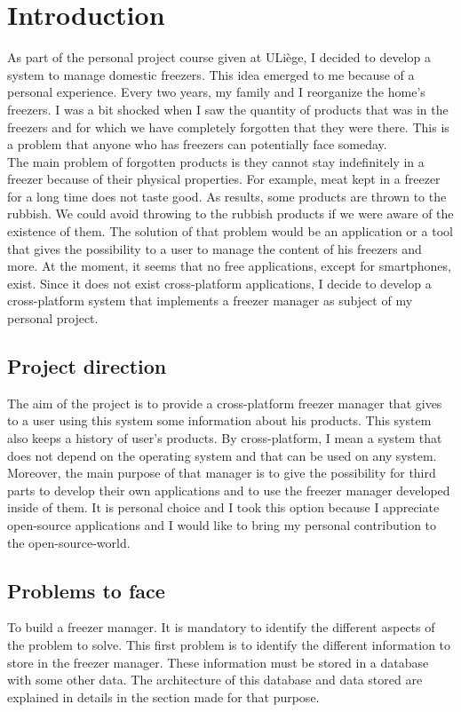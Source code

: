 \section{Introduction}
As part of the personal project course given at ULiège, I decided to develop a system to manage domestic freezers. This idea emerged to me because of a personal experience. Every two years, my family and I reorganize the home's freezers. I was a bit shocked when I saw the quantity of products that was in the freezers and for which we have completely forgotten that they were there. This is a problem that anyone who has freezers can potentially face someday. \\

The main problem of forgotten products is they cannot stay indefinitely in a freezer because of their physical properties. For example, meat kept in a freezer for a long time does not taste good. As results, some products are thrown to the rubbish. We could avoid throwing to the rubbish products if we were aware of the existence of them. The solution of that problem would be an application or a tool that gives the possibility to a user to manage the content of his freezers and more. At the moment, it seems that no free applications, except for smartphones, exist. Since it does not exist cross-platform applications, I decide to develop a cross-platform system that implements a freezer manager as subject of my personal project.

\subsection{Project direction}
The aim of the project is to provide a cross-platform freezer manager that gives to a user using this system some information about his products. This system also keeps a history of user's products. By cross-platform, I mean a system that does not depend on the operating system and that can be used on any system. Moreover, the main purpose of that manager is to give the possibility for third parts to develop their own applications and to use the freezer manager developed inside of them. It is personal choice and I took this option because I appreciate open-source applications and I would like to bring my personal contribution to the open-source-world. \\

\subsection{Problems to face}
To build a freezer manager. It is mandatory to identify the different aspects of the problem to solve. This first problem is to identify the different information to store in the freezer manager. These information must be stored in a database with some other data. The architecture of this database and data stored are explained in details in the section made for that purpose.\\

